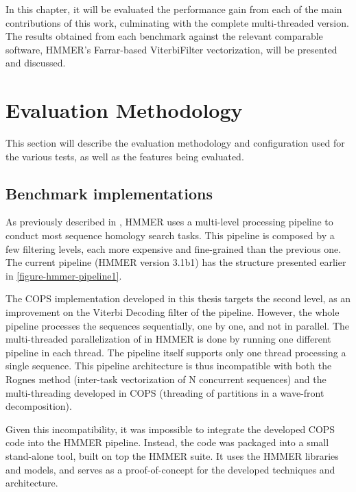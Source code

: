 	
	




In this chapter, it will be evaluated the performance gain from each of the main contributions of this work, culminating with the complete multi-threaded version. The results obtained from each benchmark against the relevant comparable software, HMMER's Farrar-based ViterbiFilter vectorization, will be presented and discussed.

\section{Evaluation Methodology}

This section will describe the evaluation methodology and configuration used for the various tests, as well as the features being evaluated. 

\subsection{Benchmark implementations}

As previously described in , HMMER uses a multi-level processing pipeline to conduct most sequence homology search tasks. This pipeline is composed by a few filtering levels, each more expensive and fine-grained than the previous one. The current pipeline (HMMER version 3.1b1) has the structure presented earlier in \autoref{figure-hmmer-pipeline1}.

The COPS implementation developed in this thesis targets the second level, as an improvement on the Viterbi Decoding filter of the pipeline. However, the whole pipeline processes the sequences sequentially, one by one, and not in parallel. The multi-threaded parallelization of in HMMER is done by running one different pipeline in each thread. The pipeline itself supports only one thread processing a single sequence.
This pipeline architecture is thus incompatible with both the Rognes method (inter-task vectorization of N concurrent sequences) and the multi-threading developed in COPS (threading of partitions in a wave-front decomposition). 

Given this incompatibility, it was impossible to integrate the developed COPS code into the HMMER pipeline. Instead, the code was packaged into a small stand-alone tool, built on top the HMMER suite. It uses the HMMER libraries and models, and serves as a proof-of-concept for the developed techniques and architecture.

